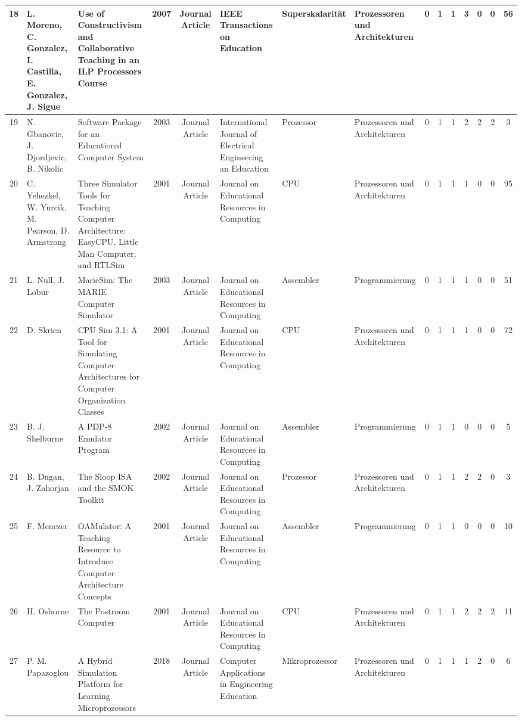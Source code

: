 \begin{landscape}
\begin{longtable}{|c|p{2cm}|p{2cm}|c|c|p{2cm}|p{1cm}|p{1cm}|c|c|c|c|c|c|c|}
    18 & L. Moreno, C. Gonzalez, I. Castilla, E. Gonzalez, J. Sigue & Use of Constructivism and Collaborative Teaching in an ILP Processors Course & 2007 & Journal Article & IEEE Transactions on Education & Superskalarität & Prozessoren und Architekturen & 0 & 1 & 1 & 3 & 0 & 0 & 56 \\ \hline
    19 & N. Gbanovic, J. Djordjevic, B. Nikolic & Software Package for an Educational Computer System & 2003 & Journal Article & International Journal of Electrical Engineering an Education & Prozessor & Prozessoren und Architekturen & 0 & 1 & 1 & 2 & 2 & 2 & 3 \\ \hline
    20 & C. Yehezkel, W. Yurcik, M. Pearson, D. Armstrong & Three Simulator Tools for Teaching Computer Architecture: EasyCPU, Little Man Computer, and RTLSim & 2001 & Journal Article & Journal on Educational Resources in Computing & CPU & Prozessoren und Architekturen & 0 & 1 & 1 & 1 & 0 & 0 & 95 \\ \hline
    21 & L. Null, J. Lobur & MarieSim: The MARIE Computer Simulator & 2003 & Journal Article & Journal on Educational Resources in Computing & Assembler & Programmierung & 0 & 1 & 1 & 1 & 0 & 0 & 51 \\ \hline
    22 & D. Skrien & CPU Sim 3.1: A Tool for Simulating Computer Architectures for Computer Organization Classes & 2001 & Journal Article & Journal on Educational Resources in Computing & CPU & Prozessoren und Architekturen & 0 & 1 & 1 & 1 & 0 & 0 & 72 \\ \hline
    23 & B. J. Shelburne & A PDP-8 Emulator Program & 2002 & Journal Article & Journal on Educational Resources in Computing & Assembler & Programmierung & 0 & 1 & 1 & 0 & 0 & 0 & 5 \\ \hline
    24 & B. Dugan, J. Zahorjan & The Sloop ISA and the SMOK Toolkit & 2002 & Journal Article & Journal on Educational Resources in Computing & Prozessor & Prozessoren und Architekturen & 0 & 1 & 1 & 2 & 2 & 0 & 3 \\ \hline
    25 & F. Menczer & OAMulator: A Teaching Resource to Introduce Computer Architecture Concepts & 2001 & Journal Article & Journal on Educational Resources in Computing & Assembler & Programmierung & 0 & 1 & 1 & 0 & 0 & 0 & 10 \\ \hline
    26 & H. Osborne & The Postroom Computer & 2001 & Journal Article & Journal on Educational Resources in Computing & CPU & Prozessoren und Architekturen & 0 & 1 & 1 & 2 & 2 & 2 & 11 \\ \hline
    27 & P. M. Papazoglou & A Hybrid Simulation Platform for Learning Microprozessors & 2018 & Journal Article & Computer Applications in Engineering Education & Mikroprozessor & Prozessoren und Architekturen & 0 & 1 & 1 & 1 & 2 & 0 & 6 \\ \hline

\end{longtable}
\end{landscape}
